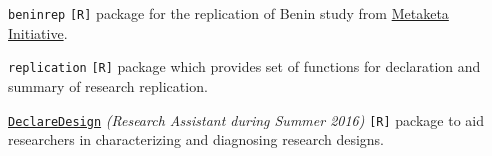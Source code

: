 
\begin{cvskills}

\cvskill
    {\texttt{beninrep}} %
    {\texttt{[R]} package for the replication of Benin study from \href{http://egap.org/metaketa}{Metaketa Initiative}.} %

\cvskill
    {\texttt{replication}} %
    {\texttt{[R]} package which provides set of functions for declaration and summary of research replication.} %

\cvskill
    {\href{https://declaredesign.org/}{\texttt{DeclareDesign}}} %
    {\emph{(Research Assistant during Summer 2016)} \texttt{[R]} package to aid researchers in characterizing and diagnosing research designs.} %


\end{cvskills}